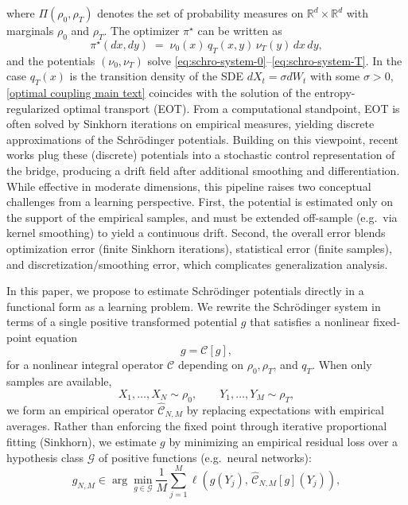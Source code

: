 \documentclass[11pt]{article}
\theoremstyle{remark}
\numberwithin{equation}{section}
\begin{document}
where $\Pi(\rho_0,\rho_T)$ denotes the set of probability measures on
$\mathbb{R}^d\times\mathbb{R}^d$ with marginals $\rho_0$ and $\rho_T$.
The optimizer $\pi^\star$ can be written as
\begin{equation}
\label{optimal coupling main text}
    \pi^\star(dx,dy)
  \;=\;
  \nu_0(x)\,q_T(x,y)\,\nu_T(y)\,dx\,dy,
\end{equation}
and the potentials $(\nu_0,\nu_T)$ solve \eqref{eq:schro-system-0}--\eqref{eq:schro-system-T}.
In the case $q_T(x)$ is the transition density of the SDE $dX_t = 
\sigma dW_t$ with some $\sigma > 0$,  \eqref{optimal coupling main text} coincides with the solution of the entropy-regularized optimal transport (EOT). From a computational standpoint, EOT is often solved by Sinkhorn iterations on empirical measures, yielding discrete approximations of the Schr\"odinger potentials. Building on this viewpoint, recent works plug these (discrete) potentials into a stochastic control representation of the bridge, producing a drift field after additional smoothing and differentiation. While effective in moderate dimensions, this pipeline raises two conceptual challenges from a learning perspective. First, the potential is estimated only on the support of the empirical samples, and must be extended off-sample (e.g.\ via kernel smoothing) to yield a continuous drift. Second, the overall error blends optimization error (finite Sinkhorn iterations), statistical error (finite samples), and discretization/smoothing error, which complicates generalization analysis.
\par
In this paper, we propose to estimate Schr\"odinger potentials directly in a functional form as a learning problem. We rewrite the Schr\"odinger system in terms of a single positive transformed potential $g$ that satisfies a nonlinear fixed-point equation
\begin{equation}
g = \mathcal{C}[g],
\end{equation}
for a nonlinear integral operator $\mathcal{C}$ depending on $\rho_0,\rho_T$, and $q_T$. When only samples are available,
\[
X_1,\dots,X_N \sim \rho_0,
\qquad
Y_1,\dots,Y_M \sim \rho_T,
\]
we form an empirical operator $\widehat{\mathcal{C}}_{N,M}$ by replacing expectations with empirical averages. Rather than enforcing the fixed point through iterative proportional fitting (Sinkhorn), we estimate $g$ by minimizing an empirical residual loss over a hypothesis class $\mathcal{G}$ of positive functions (e.g.\ neural networks):
\begin{equation}
\widehat{g}_{N,M} \in \arg\min_{g\in\mathcal{G}}
\frac{1}{M}\sum_{j=1}^M
\ell\!\left(g(Y_j),\,\widehat{\mathcal{C}}_{N,M}[g](Y_j)\right),
\end{equation}
\end{document}
